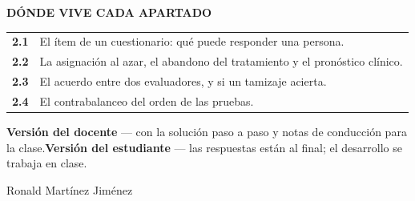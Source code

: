 \begin{titlepage}
\vspace{1.4em}
{\footnotesize\sffamily\bfseries\color{apagado}\MakeUppercase{Dónde vive cada apartado}}\par
\vspace{0.4em}
\begin{tabular}{@{}p{2cm}p{11.2cm}@{}}
\textbf{2.1} & El ítem de un cuestionario: qué puede responder una persona. \\[0.3em]
\textbf{2.2} & La asignación al azar, el abandono del tratamiento y el pronóstico clínico. \\[0.3em]
\textbf{2.3} & El acuerdo entre dos evaluadores, y si un tamizaje acierta. \\[0.3em]
\textbf{2.4} & El contrabalanceo del orden de las pruebas. \\
\end{tabular}\par

\vfill
{\color{apagado}\small
\ifdocente\textbf{Versión del docente} — con la solución paso a paso y notas de
conducción para la clase.\else\textbf{Versión del estudiante} — las respuestas
están al final; el desarrollo se trabaja en clase.\fi}\par
\vspace{0.3em}
{\color{apagado}\small Ronald Martínez Jiménez}\par
\end{titlepage}
